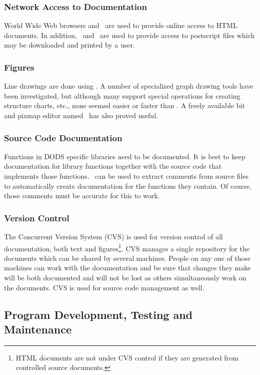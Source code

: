 \subsubsection{Network Access to Documentation}

World Wide Web browsers and \httpd\ are used to provide online access to HTML
documents. In addition, \ftp\ and \ftpd\ are used to provide access to
postscript files which may be downloaded and printed by a user.

\subsubsection{Figures}

Line drawings are done using \xfig. A number of specialized graph drawing
tools have been investigated, but although many support special operations
for creating structure charts, etc., none seemed easier or faster than \xfig.
A freely available bit and pixmap editor named \xpaint\ has also proved useful.

\subsubsection{Source Code Documentation}

Functions in DODS specific libraries need to be documented. It is best to
keep documentation for library functions together with the source code that
implements those functions. \cextdoc\ can be used to extract comments from
source files to automatically create documentation for the functions they
contain. Of course, those comments must be accurate for this to work.

\subsubsection{Version Control}
\label{cvs}

The Concurrent Version System (CVS) is used for version control of all
documentation, both text and figures\footnote{HTML documents are not under
CVS control if they are generated from controlled source documents.}.  CVS
manages a single repository for the documents which can be shared by several
machines.  People on any one of those machines can work with the
documentation and be sure that changes they make will be both documented and
will not be lost as others simultaneously work on the documents. CVS is used
for source code management as well.

\subsection{Program Development, Testing and Maintenance}

